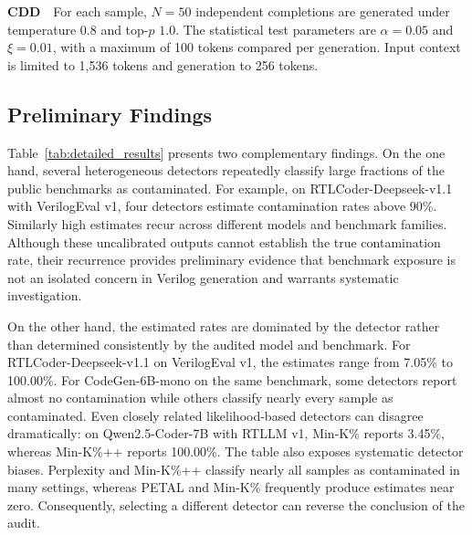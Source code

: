 \textbf{CDD}\ \ For each sample, $N=50$ independent completions are generated under temperature $0.8$ and top-$p$ $1.0$. The statistical test parameters are $\alpha=0.05$ and $\xi=0.01$, with a maximum of 100 tokens compared per generation. Input context is limited to 1,536 tokens and generation to 256 tokens.



\subsection{Preliminary Findings} \label{sec:results}

Table~\ref{tab:detailed_results} presents two complementary findings. On the one hand, several heterogeneous detectors repeatedly classify large fractions of the public benchmarks as contaminated. For example, on RTLCoder-Deepseek-v1.1 with VerilogEval v1, four detectors estimate contamination rates above 90\%. Similarly high estimates recur across different models and benchmark families. Although these uncalibrated outputs cannot establish the true contamination rate, their recurrence provides preliminary evidence that benchmark exposure is not an isolated concern in Verilog generation and warrants systematic investigation.

On the other hand, the estimated rates are dominated by the detector rather than determined consistently by the audited model and benchmark. For RTLCoder-Deepseek-v1.1 on VerilogEval v1, the estimates range from 7.05\% to 100.00\%. For CodeGen-6B-mono on the same benchmark, some detectors report almost no contamination while others classify nearly every sample as contaminated. Even closely related likelihood-based detectors can disagree dramatically: on Qwen2.5-Coder-7B with RTLLM v1, Min-K\% reports 3.45\%, whereas Min-K\%++ reports 100.00\%. The table also exposes systematic detector biases. Perplexity and Min-K\%++ classify nearly all samples as contaminated in many settings, whereas PETAL and Min-K\% frequently produce estimates near zero. Consequently, selecting a different detector can reverse the conclusion of the audit.



